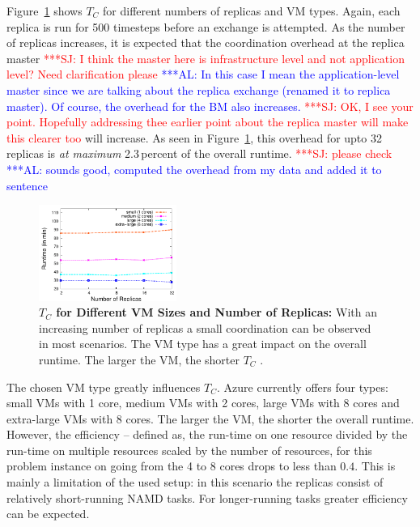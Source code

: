 \documentclass[conference,final]{IEEEtran}
\newcommand{\up}{\vspace*{-1em}}
\newcommand{\tc}{$T_{C}$ }
\newcommand{\tcnsp}{$T_{C}$}
\newcommand{\alnote}[1]{ {\textcolor{blue} { ***AL: #1 }}}
\newcommand{\jhanote}[1]{ {\textcolor{red} { ***SJ: #1 }}}
\newcommand{\alnote}[1]{}
\newcommand{\jhanote}[1]{}
\begin{document}
Figure~\ref{fig:performance_repex_scaleout_vmsizes} shows \tc for
different numbers of replicas and VM types.  Again, each replica is
run for 500 timesteps before an exchange is attempted. As the number
of replicas increases, it is expected that the coordination overhead
at the replica master \jhanote{I think the master here is
  infrastructure level and not application level? Need clarification
  please} \alnote{In this case I mean the application-level master
  since we are talking about the replica exchange (renamed it to
  replica master).  Of course, the overhead for the BM also
  increases.}\jhanote{OK, I see your point. Hopefully addressing thee
  earlier point about the replica master will make this clearer too}
will increase. As seen in
Figure~\ref{fig:performance_repex_scaleout_vmsizes}, this overhead for
upto 32 replicas is {\it at maximum} 2.3\,percent of the overall
runtime. \jhanote{please check} \alnote{sounds good, computed the
  overhead from my data and added it to sentence}
\begin{figure}[ht]
    \centering
        \includegraphics[width=0.4\textwidth]{performance/repex-azure.pdf}
        \caption{\textbf{\tc for Different VM Sizes and Number of
            Replicas:} With an increasing number of replicas a small
          coordination can be observed in most scenarios. The VM type
          has a great impact on the overall runtime. The larger the
          VM, the shorter \tc. }
    \label{fig:performance_repex_scaleout_vmsizes}
    \up
\end{figure}

The chosen VM type greatly influences \tcnsp. Azure currently offers
four types: small VMs with 1 core, medium VMs with 2 cores, large VMs
with 8 cores and extra-large VMs with 8 cores. The larger the VM, the
shorter the overall runtime.  However, the efficiency -- defined as,
the run-time on one resource divided by the run-time on multiple
resources scaled by the number of resources, for this problem instance
on going from the 4 to 8 cores drops to less than $0.4$. This is
mainly a limitation of the used setup: in this scenario the replicas
consist of relatively short-running NAMD tasks.  For longer-running
tasks greater efficiency can be
expected.  %
\end{document}
